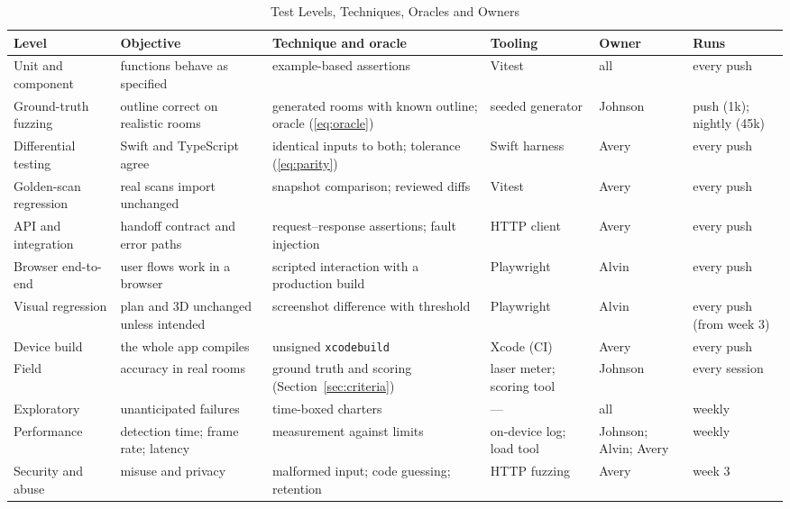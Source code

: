 \documentclass[conference,a4paper,10pt]{IEEEtran}
\begin{document}
\begin{table}[!t]
\caption{Test Levels, Techniques, Oracles and Owners}
\label{tab:levels}
\centering
\footnotesize
\begin{tabularx}{\textwidth}{@{}L{2.5cm}L{3.2cm}YL{1.9cm}L{1.6cm}L{2.0cm}@{}}
\toprule
Level & Objective & Technique and oracle & Tooling & Owner & Runs \\
\midrule
Unit and component & functions behave as specified & example-based assertions & Vitest~\cite{vitest} & all & every push \\
Ground-truth fuzzing & outline correct on realistic rooms & generated rooms with known outline; oracle (\ref{eq:oracle}) & seeded generator & Johnson & push (1k); nightly (45k) \\
Differential testing & Swift and TypeScript agree & identical inputs to both; tolerance (\ref{eq:parity}) & Swift harness & Avery & every push \\
Golden-scan regression & real scans import unchanged & snapshot comparison; reviewed diffs & Vitest & Avery & every push \\
API and integration & handoff contract and error paths & request--response assertions; fault injection & HTTP client & Avery & every push \\
Browser end-to-end & user flows work in a browser & scripted interaction with a production build & Playwright~\cite{playwright} & Alvin & every push \\
Visual regression & plan and 3D unchanged unless intended & screenshot difference with threshold & Playwright & Alvin & every push (from week 3) \\
Device build & the whole app compiles & unsigned \texttt{xcodebuild} & Xcode (CI) & Avery & every push \\
Field & accuracy in real rooms & ground truth and scoring (Section~\ref{sec:criteria}) & laser meter; scoring tool & Johnson & every session \\
Exploratory & unanticipated failures & time-boxed charters & --- & all & weekly \\
Performance & detection time; frame rate; latency & measurement against limits & on-device log; load tool & Johnson; Alvin; Avery & weekly \\
Security and abuse & misuse and privacy & malformed input; code guessing; retention & HTTP fuzzing & Avery & week 3 \\
\bottomrule
\end{tabularx}
\end{table}
\end{document}
